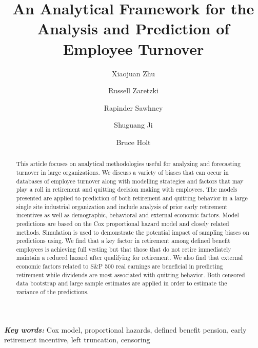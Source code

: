 \documentclass[12pt,letterpaper]{article}
\title{An Analytical Framework for the Analysis and Prediction of Employee Turnover}
\author[1]{Xiaojuan Zhu}
\author[2]{Russell Zaretzki}
\author[1]{Rapinder Sawhney}
\author[1]{Shuguang Ji}
\author[1]{Bruce Holt}%
\affil[1]{Industrial \& Systems Engineering, University of Tennessee, Knoxville}
\affil[2]{Business Analytics \& Statistics, University of Tennessee, Knoxville}
\providecommand{\keywords}[1]{\textbf{\textit{Key words:}} #1} %
\begin{document}
\maketitle

\begin{abstract}
This article focuses on analytical methodologies useful for analyzing and forecasting turnover in large organizations. We discuss a variety of biases that can occur in databases of employee turnover along with modelling strategies and factors that may play a roll in retirement and quitting decision making with employees. The models presented are applied to prediction of both retirement and quitting behavior in a large single site industrial organization and include analysis of prior early retirement incentives as well as demographic, behavioral and external economic factors. Model predictions are based on the Cox proportional hazard model and closely related methods. Simulation is used to demonstrate the potential impact of sampling biases on predictions using. We find that a key factor in retirement among defined benefit employees is achieving full vesting but that those that do not retire immediately maintain a reduced hazard after qualifying for retirement. We also find that external economic factors related to S\&P 500 real earnings are beneficial in predicting retirement while dividends are most associated with quitting behavior.  Both censored data bootstrap and large sample estimates are applied in order to estimate the variance of the predictions.

\end{abstract}

\keywords {Cox model, proportional hazards, defined benefit pension, early retirement incentive, left truncation, censoring}


\end{document}
